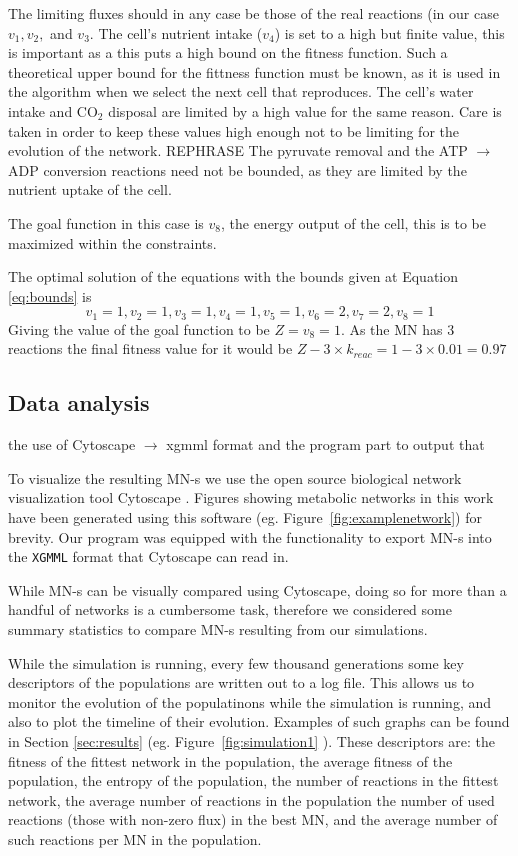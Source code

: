 \documentclass[10pt,a4paper]{article}
\begin{document}
	The limiting fluxes should in any case be those of the real reactions (in our case $v_1, v_2,$ and $v_3$. The cell's nutrient intake ($v_4$) is set to a high but finite value, this is important as a this puts a high bound on the fitness function. Such a theoretical upper bound for the fittness function must be known, as it is used in the algorithm when we select the next cell that reproduces. The cell's water intake and CO$_2$ disposal are limited by a high value for the same reason. Care is taken in order to keep these values high enough not to be limiting for the evolution of the network. REPHRASE The pyruvate removal and the ATP $\rightarrow$ ADP conversion reactions need not be bounded, as they are limited by the nutrient uptake of the cell. 

	The goal function in this case is $v_8$, the energy output of the cell, this is to be maximized within the constraints.

	The optimal solution of the equations with the bounds given at Equation \ref{eq:bounds} is 
	\begin{equation}\label{eq:solution}
		v_1=1 , v_2=1, v_3=1, v_4=1, v_5=1, v_6=2, v_7=2, v_8=1
	\end{equation}
	Giving the value of the goal function to be $Z=v_8=1$. As the MN has $3$ reactions the final fitness value for it would be $Z-3\times k_{reac}=1-3\times 0.01=0.97$
\subsection{Data analysis}
\label{sub:visualization}

the use of Cytoscape $\rightarrow$ xgmml format and the  program part to output that

To visualize the resulting MN-s we use the open source biological network visualization tool Cytoscape \cite{cytoscape}. Figures showing metabolic networks in this work have been generated using this software (eg.  Figure~\ref{fig:examplenetwork}) for brevity. Our program was equipped with the functionality to export MN-s into the \texttt{XGMML} format that Cytoscape can read in. 

While MN-s can be visually compared using Cytoscape, doing so for more than a handful of networks is a cumbersome task, therefore we considered some summary statistics to compare MN-s resulting from our simulations.

While the simulation is running, every few thousand generations some key descriptors of the populations are written out to a log file. This allows us to monitor the evolution of the populatinons while the simulation is running, and also to plot the timeline of their evolution. Examples of such graphs can be found in Section \ref{sec:results} (eg. Figure~\ref{fig:simulation1} ). These descriptors are: the fitness of the fittest network in the population, the average fitness of the population, the entropy of the population, the number of reactions in the fittest network, the average number of reactions in the population the number of used reactions (those with non-zero flux) in the best MN, and the average number of such reactions per MN in the population. 
\end{document}
